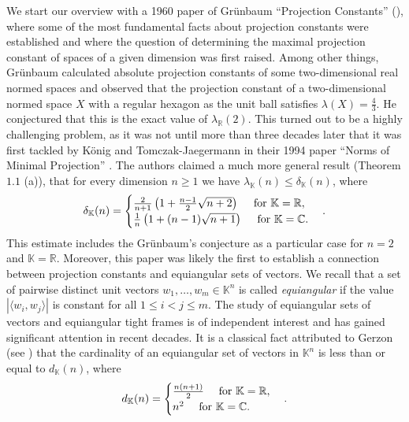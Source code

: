 \documentclass[12pt, reqno]{amsart}
\theoremstyle{definition}
\theoremstyle{remark}
\numberwithin{equation}{section}
\begin{document}
We start our overview with a 1960 paper of Gr\"unbaum ``Projection Constants'' (\cite{grunbaum}), where some of the most fundamental facts about projection constants were established and where the question of determining the maximal projection constant of spaces of a given dimension was first raised. Among other things, Gr\"unbaum calculated absolute projection constants of some two-dimensional real normed spaces and observed that the projection constant of a two-dimensional normed space $X$ with a regular hexagon as the unit ball satisfies $\lambda(X) = \frac{4}{3}$. He conjectured that this is the exact value of $\lambda_{\mathbb{R}}(2)$. This turned out to be a highly challenging problem, as it was not until more than three decades later that it was first tackled by K\"onig and Tomczak-Jaegermann in their 1994 paper ``Norms of Minimal Projection'' \cite{konigtomczak}. The authors claimed a much more general result (Theorem $1.1$ (a)), that for every dimension $n \geq 1$ we have $\lambda_{\mathbb{K}}(n) \leq \delta_{\mathbb{K}}(n)$, where
$$\delta_{\mathbb{K}}(n)= \begin{cases} \frac{2}{n+1} \left ( 1 + \frac{n-1}{2} \sqrt{n+2}\right ) \quad \hbox{ for } \mathbb{K}=\mathbb{R}, \\
\frac{1}{n} \left ( 1 + (n-1) \sqrt{n+1} \right ) \quad \hbox{ for } \mathbb{K}=\mathbb{C}.
\end{cases}.$$
This estimate includes the Gr\"unbaum's conjecture as a particular case for $n=2$ and $\mathbb{K}=\mathbb{R}$. Moreover, this paper was likely the first to establish a connection between projection constants and equiangular sets of vectors. We recall that a set of pairwise distinct unit vectors $w_1, \ldots, w_m \in \mathbb{K}^n$ is called \emph{equiangular} if the value $|\langle w_i, w_j \rangle|$ is constant for all $1 \leq i < j \leq m$. The study of equiangular sets of vectors and equiangular tight frames is of independent interest and has gained significant attention in recent decades. It is a classical fact attributed to Gerzon (see \cite{lemmensseidel}) that the cardinality of an equiangular set of vectors in $\mathbb{K}^n$ is less than or equal to $d_{\mathbb{K}}(n)$, where
$$d_{\mathbb{K}}(n)= \begin{cases} \frac{n(n+1)}{2} \quad \hbox{ for } \mathbb{K}=\mathbb{R}, \\
n^2 \quad \hbox{ for } \mathbb{K}=\mathbb{C}.
\end{cases}.$$
\end{document}
